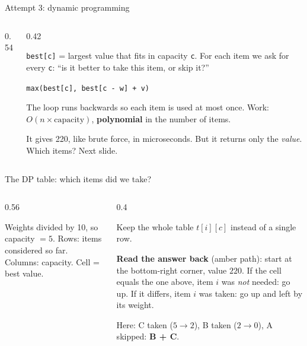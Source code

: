\documentclass[aspectratio=169,10pt]{beamer}
\newcommand{\figtab}[2][0.5]{\begin{sfig}[#1]\end{sfig}}
\begin{document}
\begin{frame}{Attempt 3: dynamic programming}
\begin{columns}[T]
\begin{column}{0.54\textwidth}
\end{column}
\begin{column}{0.42\textwidth}
{\small
\texttt{best[c]} = largest value that fits in capacity \texttt{c}. For each item we ask for every \texttt{c}: ``is it better to take this item, or skip it?''

\vspace{2mm}
\texttt{max(best[c], best[c - w] + v)}

\vspace{2mm}
The loop runs backwards so each item is used at most once. Work: $O(n\times\text{capacity})$, \textbf{polynomial} in the number of items.

\vspace{2mm}
It gives 220, like brute force, in microseconds. But it returns only the \emph{value}. Which items? Next slide.}
\end{column}
\end{columns}
\end{frame}

\begin{frame}{The DP table: which items did we take?}
\begin{columns}[T]
\begin{column}{0.56\textwidth}
\figtab[0.55]{fig_knap}
\vspace{1mm}
{\footnotesize Weights divided by 10, so capacity $=5$. Rows: items considered so far. Columns: capacity. Cell = best value.}
\end{column}
\begin{column}{0.4\textwidth}
{\small
Keep the whole table $t[i][c]$ instead of a single row.

\vspace{2mm}
\textbf{Read the answer back} (amber path): start at the bottom-right corner, value $220$. If the cell equals the one above, item $i$ was \emph{not} needed: go up. If it differs, item $i$ \colorbox{tdGreen!40}{was taken}: go up and left by its weight.

\vspace{2mm}
Here: C taken ($5\to2$), B taken ($2\to0$), A skipped: \textbf{B + C}.}
\end{column}
\end{columns}
\end{frame}
\end{document}
